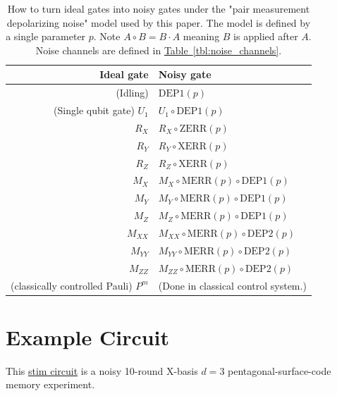 \documentclass[onecolumn,unpublished,a4paper]{quantumarticle}
\theoremstyle{definition}
\theoremstyle{definition}
\theoremstyle{definition}
\newcommand{\tbl}[1]{\hyperref[tbl:#1]{Table~\ref*{tbl:#1}}}
\begin{document}
\begin{table}[h!]
    \centering
    \begin{tabular}{|r|l|}
    \hline
    Ideal gate & Noisy gate
    \\
    \hline
    (Idling) & $\text{DEP1}(p)$
    \\
    (Single qubit gate) $U_1$ & $U_1 \circ \text{DEP1}(p)$
    \\
    \hline
    $R_X$ & $R_X \circ \text{ZERR}(p)$
    \\
    $R_Y$ & $R_Y \circ \text{XERR}(p)$
    \\
    $R_Z$ & $R_Z \circ \text{XERR}(p)$
    \\
    \hline
    $M_X$ & $M_X \circ \text{MERR}(p) \circ \text{DEP1}(p)$
    \\
    $M_Y$ & $M_Y \circ \text{MERR}(p) \circ \text{DEP1}(p)$
    \\
    $M_Z$ & $M_Z \circ \text{MERR}(p) \circ \text{DEP1}(p)$
    \\
    \hline
    $M_{XX}$ & $M_{XX} \circ \text{MERR}(p) \circ \text{DEP2}(p)$
    \\
    $M_{YY}$ & $M_{YY} \circ \text{MERR}(p) \circ \text{DEP2}(p)$
    \\
    $M_{ZZ}$ & $M_{ZZ} \circ \text{MERR}(p) \circ \text{DEP2}(p)$
    \\
    \hline
    (classically controlled Pauli) $P^m$ & (Done in classical control system.)
    \\
    \hline
    \end{tabular}
    \caption{
        How to turn ideal gates into noisy gates under the "pair measurement depolarizing noise" model used by this paper.
        The model is defined by a single parameter $p$.
        Note $A \circ B = B \cdot A$ meaning $B$ is applied after $A$.
        Noise channels are defined in \tbl{noise_channels}.
    }
    \label{tbl:noise_model}
\end{table}

\clearpage
\section{Example Circuit}
\label{app:example_circuit}

This \href{https://github.com/quantumlib/Stim/blob/main/doc/file_format_stim_circuit.md}{stim circuit} is a noisy 10-round X-basis $d=3$ pentagonal-surface-code memory experiment.
\end{document}
